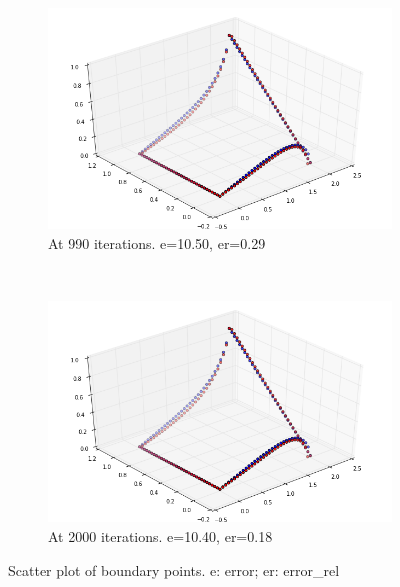 \documentclass[a4paper,12pt]{article}
\begin{document}
\begin{figure}[h!]
  \centering
  \begin{subfigure}[b]{0.48\textwidth}
    \includegraphics[width=\textwidth]{hpsc_a1_scat_990.png}
    \caption{At 990 iterations. e=10.50, er=0.29}
  \end{subfigure}
~
\begin{subfigure}[b]{0.48\textwidth}
    \includegraphics[width=\textwidth]{hpsc_a1_scat_2000.png}
    \caption{At 2000 iterations. e=10.40, er=0.18}
  \end{subfigure}
  \caption{Scatter plot of boundary points. e: error; er: error\_rel}
\end{figure}
\end{document}
